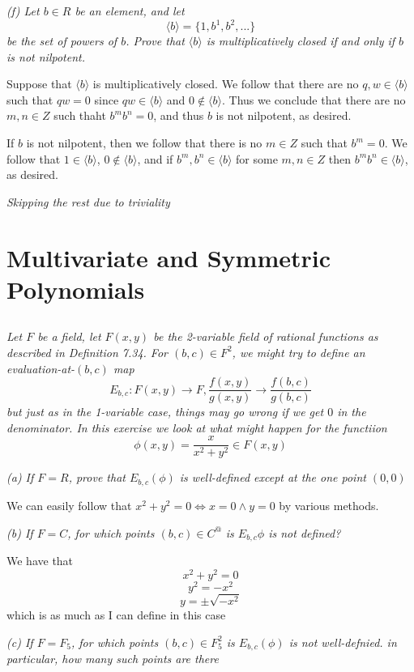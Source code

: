 \documentclass[11pt,oneside,titlepage]{book}
\DeclareMathOperator \lra {\Leftrightarrow}
\newcommand{\eangle}[1]{\langle #1 \rangle}
\newcommand{\set}[1]{\{ #1 \}}
\begin{document}
\textit{(f) Let $b \in R$ be an element, and let
  $$\eangle{b} = \set{1, b^1, b^2, ...}$$
  be the set of powers of $b$. Prove that $\eangle{b}$ is multiplicatively
  closed if and only if $b$ is not nilpotent.}

Suppose that $\eangle{b}$ is multiplicatively closed. We follow that
there are no $q, w \in \eangle{b}$ such that $qw = 0$ since $qw \in
\eangle{b}$ and $0 \notin \eangle{b}$. Thus we conclude that there
are no $m, n \in Z$ such thaht $b^m b^n = 0$, and thus $b$
is not nilpotent, as desired.

If $b$ is not nilpotent, then we follow that there is no $m \in Z$
such that $b^m = 0$. We follow that $1 \in \eangle{b}$,
$0 \notin \eangle{b}$, and if $b^m, b^n \in \eangle{b}$ for some
$m, n \in Z$ then $b^mb^n \in \eangle{b}$, as desired.

\textit{Skipping the rest due to triviality}

\section{Multivariate and Symmetric Polynomials}

\subsection{}

\textit{Let $F$ be a field, let $F(x, y)$ be the 2-variable field of
  rational functions as described in Definition 7.34. For $(b, c) \in
  F^2$, we might try to define an evaluation-at-$(b, c)$ map
  $$E_{b, c}: F(x, y) \to F, \frac{f(x, y)}{g(x, y)} \to \frac{f(b, c)}{g(b, c)}$$
  but just as in the 1-variable case, things may go wrong if we get
  $0$ in the denominator. In this exercise we look at what might happen
  for the functiion
  $$\phi(x, y) = \frac{x}{x^2 + y^2} \in F(x, y)$$
}

\textit{(a) If $F = R$, prove that $E_{b, c}(\phi)$ is well-defined
  except at the one point $(0, 0)$}

We can easily follow that $x^2 + y^2 = 0 \lra x = 0 \land y = 0$ by
various methods.

\textit{(b) If $F = C$, for which points $(b, c) \in C^@$ is $E_{b,
    c}{\phi}$ is not defined?}

We have that
$$x^2 + y^2 = 0$$
$$y^2 = - x^2$$
$$y = \pm \sqrt{- x^2}$$
which is as much as I can define in this case

\textit{(c) If $F = F_5$, for which points $(b, c) \in F_5^2$ is
  $E_{b, c}(\phi)$ is not well-defnied. in particular, how many such
  points are there}
\end{document}
